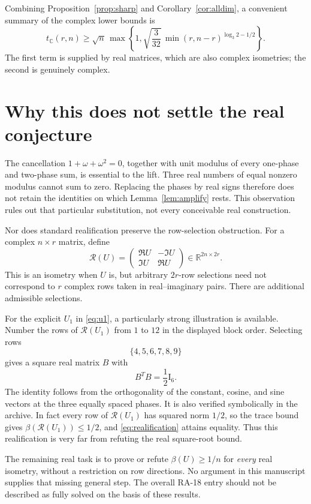 \documentclass[11pt,letterpaper]{article}
\theoremstyle{definition}
\theoremstyle{remark}
\newcommand{\R}{\mathbb R}
\newcommand{\C}{\mathbb C}
\newcommand{\Id}{\mathrm I}
\begin{document}
Combining Proposition~\ref{prop:sharp} and Corollary~\ref{cor:alldim}, a convenient summary of the complex lower bounds is
\[
 t_\C(r,n)\ge\sqrt n\,
 \max\left\{1,\sqrt{\frac3{32}}\,\min(r,n-r)^{\log_3 2-1/2}\right\}.
\]
The first term is supplied by real matrices, which are also complex isometries; the second is genuinely complex.

\section{Why this does not settle the real conjecture}

The cancellation $1+\omega+\omega^2=0$, together with unit modulus of every one-phase and two-phase sum, is essential to the lift. Three real numbers of equal nonzero modulus cannot sum to zero. Replacing the phases by real signs therefore does not retain the identities on which Lemma~\ref{lem:amplify} rests. This observation rules out that particular substitution, not every conceivable real construction.

Nor does standard realification preserve the row-selection obstruction. For a complex $n\times r$ matrix, define
\[
 \mathcal R(U)=\begin{pmatrix}\Re U&-\Im U\\\Im U&\Re U\end{pmatrix}
 \in\R^{2n\times2r}.
\]
This is an isometry when $U$ is, but arbitrary $2r$-row selections need not correspond to $r$ complex rows taken in real--imaginary pairs. There are additional admissible selections.

For the explicit $U_1$ in \eqref{eq:u1}, a particularly strong illustration is available. Number the rows of $\mathcal R(U_1)$ from $1$ to $12$ in the displayed block order. Selecting rows
\[
 \{4,5,6,7,8,9\}
\]
gives a square real matrix $B$ with
\begin{equation}
 B^TB=\frac12\Id_6.
 \label{eq:realification}
\end{equation}
The identity follows from the orthogonality of the constant, cosine, and sine vectors at the three equally spaced phases. It is also verified symbolically in the archive. In fact every row of $\mathcal R(U_1)$ has squared norm $1/2$, so the trace bound gives $\beta(\mathcal R(U_1))\le1/2$, and \eqref{eq:realification} attains equality. Thus this realification is very far from refuting the real square-root bound.

The remaining real task is to prove or refute $\beta(U)\ge1/n$ for \emph{every} real isometry, without a restriction on row directions. No argument in this manuscript supplies that missing general step. The overall RA-18 entry should not be described as fully solved on the basis of these results.
\end{document}
